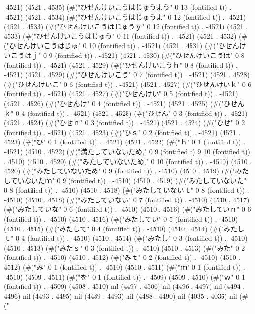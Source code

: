 -4521) (4521 . 4535) (#("ひせんけいこうはじゅうよう" 0 13 (fontified t)) . -4521) (4521 . 4534) (#("ひせんけいこうはじゅうよ" 0 12 (fontified t)) . -4521) (4521 . 4533) (#("ひせんけいこうはじゅうｙ" 0 12 (fontified t)) . -4521) (4521 . 4533) (#("ひせんけいこうはじゅう" 0 11 (fontified t)) . -4521) (4521 . 4532) (#("ひせんけいこうはじゅ" 0 10 (fontified t)) . -4521) (4521 . 4531) (#("ひせんけいこうはｊ" 0 9 (fontified t)) . -4521) (4521 . 4530) (#("ひせんけいこうは" 0 8 (fontified t)) . -4521) (4521 . 4529) (#("ひせんけいこうｈ" 0 8 (fontified t)) . -4521) (4521 . 4529) (#("ひせんけいこう" 0 7 (fontified t)) . -4521) (4521 . 4528) (#("ひせんけいこ" 0 6 (fontified t)) . -4521) (4521 . 4527) (#("ひせんけいｋ" 0 6 (fontified t)) . -4521) (4521 . 4527) (#("ひせんけい" 0 5 (fontified t)) . -4521) (4521 . 4526) (#("ひせんけ" 0 4 (fontified t)) . -4521) (4521 . 4525) (#("ひせんｋ" 0 4 (fontified t)) . -4521) (4521 . 4525) (#("ひせん" 0 3 (fontified t)) . -4521) (4521 . 4524) (#("ひせｎ" 0 3 (fontified t)) . -4521) (4521 . 4524) (#("ひせ" 0 2 (fontified t)) . -4521) (4521 . 4523) (#("ひｓ" 0 2 (fontified t)) . -4521) (4521 . 4523) (#("ひ" 0 1 (fontified t)) . -4521) (4521 . 4522) (#("ｈ" 0 1 (fontified t)) . -4521) (4510 . 4522) (#("満たしていないため," 0 9 (fontified t) 9 10 (fontified t)) . 4510) (4510 . 4520) (#("みたしていないため," 0 10 (fontified t)) . -4510) (4510 . 4520) (#("みたしていないため" 0 9 (fontified t)) . -4510) (4510 . 4519) (#("みたしていないたｍ" 0 9 (fontified t)) . -4510) (4510 . 4519) (#("みたしていないた" 0 8 (fontified t)) . -4510) (4510 . 4518) (#("みたしていないｔ" 0 8 (fontified t)) . -4510) (4510 . 4518) (#("みたしていない" 0 7 (fontified t)) . -4510) (4510 . 4517) (#("みたしていな" 0 6 (fontified t)) . -4510) (4510 . 4516) (#("みたしていｎ" 0 6 (fontified t)) . -4510) (4510 . 4516) (#("みたしてい" 0 5 (fontified t)) . -4510) (4510 . 4515) (#("みたして" 0 4 (fontified t)) . -4510) (4510 . 4514) (#("みたしｔ" 0 4 (fontified t)) . -4510) (4510 . 4514) (#("みたし" 0 3 (fontified t)) . -4510) (4510 . 4513) (#("みたｓ" 0 3 (fontified t)) . -4510) (4510 . 4513) (#("みた" 0 2 (fontified t)) . -4510) (4510 . 4512) (#("みｔ" 0 2 (fontified t)) . -4510) (4510 . 4512) (#("み" 0 1 (fontified t)) . -4510) (4510 . 4511) (#("ｍ" 0 1 (fontified t)) . -4510) (4509 . 4511) (#("を" 0 1 (fontified t)) . -4509) (4509 . 4510) (#("ｗ" 0 1 (fontified t)) . -4509) (4508 . 4510) nil (4497 . 4506) nil (4496 . 4497) nil (4494 . 4496) nil (4493 . 4495) nil (4489 . 4493) nil (4488 . 4490) nil (4035 . 4036) nil (#("
